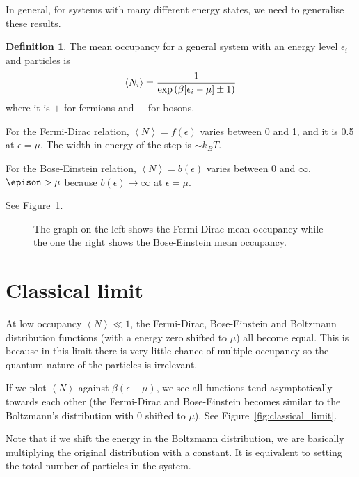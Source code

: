 \documentclass[12pt,chapterprefix=false,dvipsnames]{scrbook}
\theoremstyle{dotless}
\theoremstyle{definition}
\newtheorem{protodefinition}{Definition}[section]
\newenvironment{definition}
{\colorlet{shadecolor}{black!15}\begin{shaded}\begin{protodefinition}}
			{\end{protodefinition}\end{shaded}}
\begin{document}
In general, for systems with many different energy states, we
need to generalise these results.

\begin{definition}
	The mean occupancy for a general system with an energy level
	$\epsilon_i$ and particles is
	\begin{equation}
		\left<N_i\right>
		=
		\frac{1}{\exponential{\left( \beta[\epsilon_i - \mu] \pm 1\right)}}
	\end{equation}
	where it is $+$ for fermions and
	$-$ for bosons.

	For the Fermi-Dirac relation, $\left<N\right> = f\left(\epsilon\right)$ varies
	between 0 and 1, and it is 0.5 at $\epsilon =\mu$. The
	width in energy of the step is $\sim k_B T$.

	For the Bose-Einstein relation, $\left<N\right> = b\left(\epsilon\right)$ varies
	between 0 and $\infty$. $\epison > \mu$
	because $b\left(\epsilon\right) \rightarrow \infty$ at $\epsilon = \mu$.

	See Figure~\ref{fig:mean_occupancy}.
\end{definition}

\begin{figure}[htpb]
	\centering
	
	\caption{The graph on the left shows the Fermi-Dirac mean occupancy while
		the one the right shows the Bose-Einstein mean occupancy.}%
	\label{fig:mean_occupancy}
\end{figure}

\section{Classical limit}%
\label{sec:classical_limit}

At low occupancy $\left<N\right> \ll 1$, the Fermi-Dirac,
Bose-Einstein and Boltzmann distribution functions (with a
energy zero shifted to $\mu$) all become
equal. This is because in this limit there is very little chance
of multiple occupancy so the quantum nature of the particles is
irrelevant.

If we plot $\left<N\right>$ against
$\beta\left(\epsilon - \mu\right)$, we see all functions tend
asymptotically towards each other (the Fermi-Dirac and
Bose-Einstein becomes similar to the Boltzmann's distribution
with 0 shifted to $\mu$). See
Figure~\ref{fig:classical_limit}.

Note that if we shift the energy in the Boltzmann distribution,
we are basically multiplying the original distribution with a
constant. It is equivalent to setting the total number of
particles in the system.
\end{document}
